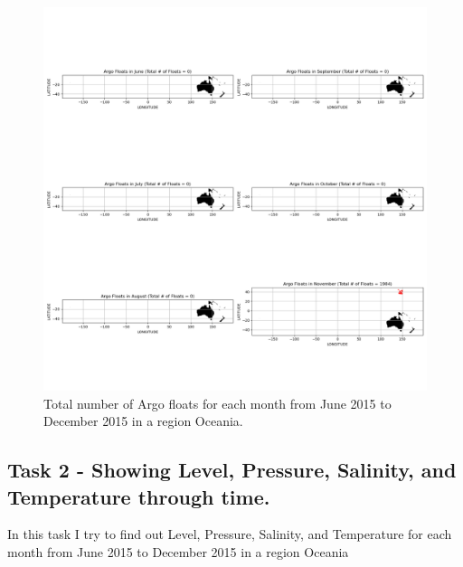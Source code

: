 \documentclass[12pt]{article}
\begin{document}
\begin{figure}[H]
\includegraphics[width=\textwidth,height=\textheight,keepaspectratio]{monthly.png}
\caption{Total number of Argo floats for each month from June 2015 to December 2015  in a region Oceania.}
\label{fig:task 1}
 
\end{figure}




\subsection{Task 2 - Showing Level, Pressure, Salinity, and Temperature through time.}

In this task I try to find out Level, Pressure, Salinity, and Temperature for each month from June 2015 to December 2015  in a region Oceania
\end{document}
